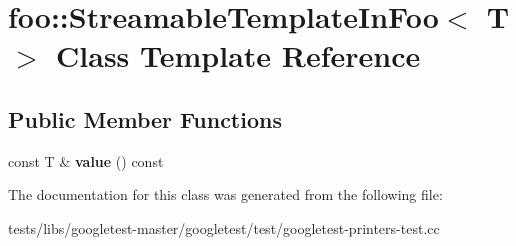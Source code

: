 \hypertarget{classfoo_1_1StreamableTemplateInFoo}{}\section{foo\+:\+:Streamable\+Template\+In\+Foo$<$ T $>$ Class Template Reference}
\label{classfoo_1_1StreamableTemplateInFoo}
\subsection*{Public Member Functions}
\begin{DoxyCompactItemize}
\item 
\mbox{\label{classfoo_1_1StreamableTemplateInFoo_aa6e29a9a298014ce74c65423b6985023}} 
const T \& {\bfseries value} () const
\end{DoxyCompactItemize}


The documentation for this class was generated from the following file\+:\begin{DoxyCompactItemize}
\item 
tests/libs/googletest-\/master/googletest/test/googletest-\/printers-\/test.\+cc\end{DoxyCompactItemize}
